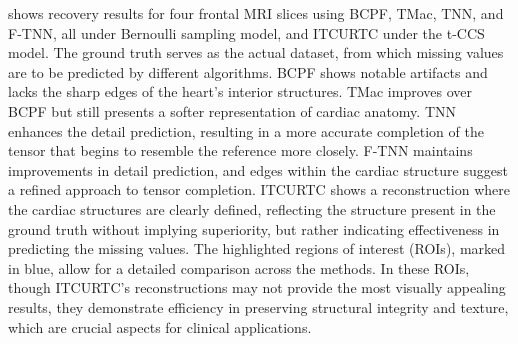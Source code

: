 \documentclass[twoside,12pt]{article}
\begin{document}
 shows recovery results for four frontal MRI slices using BCPF, TMac, TNN, and F-TNN, all under Bernoulli sampling model, and ITCURTC  under the t-CCS model. The ground truth serves as the actual dataset, from which missing values are to be predicted by different algorithms. BCPF shows notable artifacts and lacks the sharp edges of the heart's interior structures. TMac improves over BCPF but still presents a softer representation of cardiac anatomy. TNN enhances the detail prediction, resulting in a more accurate completion of the tensor that begins to resemble the reference more closely. F-TNN maintains improvements in detail prediction, and edges within the cardiac structure suggest a refined approach to tensor completion. ITCURTC shows a reconstruction where the cardiac structures are clearly defined, reflecting the structure present in the ground truth without implying superiority, but rather indicating effectiveness in predicting the missing values.  The highlighted regions of interest (ROIs), marked in blue, allow for a detailed comparison across the methods. In these ROIs, though ITCURTC's reconstructions may not provide the most visually appealing results, they demonstrate efficiency in preserving structural integrity and texture, which are crucial aspects for clinical applications. 
\end{document}
